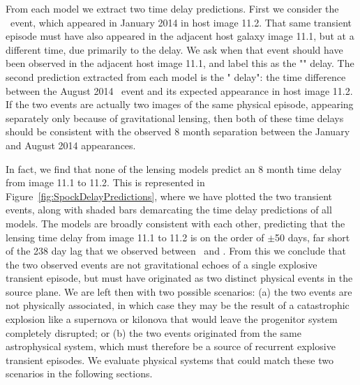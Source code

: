 From each model we extract two time delay predictions.  First we consider the \spockone\ event, which appeared in January 2014 in host image 11.2.  That same transient episode must have also appeared in the adjacent host galaxy image 11.1, but at a different time, due primarily to the \citet{Shapiro:1964} delay.  We ask when that event should have been observed in the adjacent host image 11.1, and label this as the "" delay.  The second prediction extracted from each model is the " delay": the time difference between the August 2014 \spocktwo\ event and its expected appearance in host image 11.2.   If the two events are actually two images of the same physical episode, appearing separately only because of gravitational lensing, then both of these time delays should be consistent with the observed 8 month separation between the January and August 2014 appearances.   

In fact, we find that none of the lensing models predict an 8 month time delay from image 11.1 to 11.2.  This is represented in Figure~\ref{fig:SpockDelayPredictions}, where we have plotted the two transient events, along with shaded bars demarcating the time delay predictions of all models.   The models are broadly consistent with each other, predicting that the lensing time delay from image 11.1 to 11.2 is on the order of $\pm$50 days, far short of the 238 day lag that we observed between \spockone\ and \spocktwo.  From this we conclude that the two observed events are not gravitational echoes of a single explosive transient episode, but must have originated as two distinct physical events in the source plane.  We are left then with two possible scenarios: (a) the two events are not physically associated, in which case they may be the result of a catastrophic explosion like a supernova or kilonova that would leave the progenitor system completely disrupted; or (b) the two events originated from the same astrophysical system, which must therefore be a source of recurrent explosive transient episodes.   We evaluate physical systems that could match these two scenarios in the following sections.
